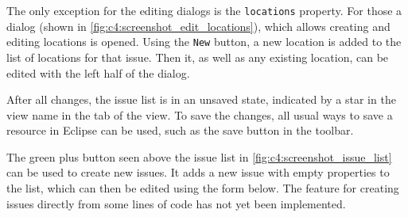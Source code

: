 The only exception for the editing dialogs is the \lstinline|locations| property.
For those a dialog (shown in \cref{fig:c4:screenshot_edit_locations}), which allows creating and editing locations is opened.
Using the \lstinline|New| button, a new location is added to the list of locations for that issue.
Then it, as well as any existing location, can be edited with the left half of the dialog.

After all changes, the issue list is in an unsaved state, indicated by a star in the view name in the tab of the view.
To save the changes, all usual ways to save a resource in \gls{Eclipse} can be used, such as the save button in the toolbar.

The green plus button seen above the issue list in \cref{fig:c4:screenshot_issue_list} can be used to create new issues.
It adds a new issue with empty properties to the list, which can then be edited using the form below.
The feature for creating issues directly from some lines of code has not yet been implemented.
